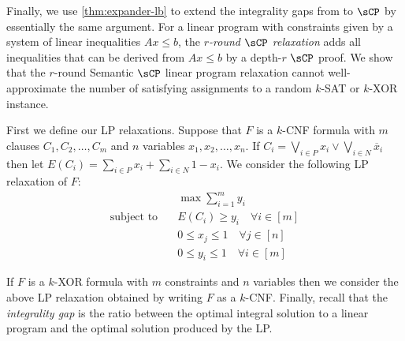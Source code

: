 \documentclass[11pt]{article}
\begin{document}
Finally, we use \autoref{thm:expander-lb} to extend the integrality gaps from \cite{BGHMP06} to $\sCP$ by essentially the same argument. 
For a linear program with constraints given by a system of linear inequalities $Ax \leq b$, the \emph{$r$-round $\sCP$ relaxation} adds all inequalities that can be derived from $Ax \leq b$ by a depth-$r$ $\sCP$ proof.
We show that the $r$-round Semantic $\sCP$ linear program relaxation cannot well-approximate the number of satisfying assignments to a random $k$-SAT or $k$-XOR instance. 

First we define our LP relaxations.
Suppose that $F$ is a $k$-CNF formula with $m$ clauses $C_1, C_2, \ldots, C_m$ and $n$ variables $x_1, x_2, \ldots, x_n$.
If $C_i = \bigvee_{i \in P} x_i \vee \bigvee_{i \in N} \overline x_i$ then let $E(C_i) = \sum_{i \in P} x_i + \sum_{i \in N} 1-x_i$.
We consider the following LP relaxation of $F$:
\begin{align*}
	& \max \sum_{i=1}^m y_i \\
	\text{subject to}\quad & E(C_i) \geq y_i \quad \forall i \in [m]\\
	& 0 \leq x_j \leq 1 \quad \forall j \in [n] \\
	& 0 \leq y_i \leq 1 \quad \forall i \in [m]
\end{align*}

If $F$ is a $k$-XOR formula with $m$ constraints and $n$ variables then we consider the above LP relaxation obtained by writing $F$ as a $k$-CNF.
Finally, recall that the \emph{integrality gap} is the ratio between the optimal integral solution to a linear program and the optimal solution produced by the LP. 
\end{document}
